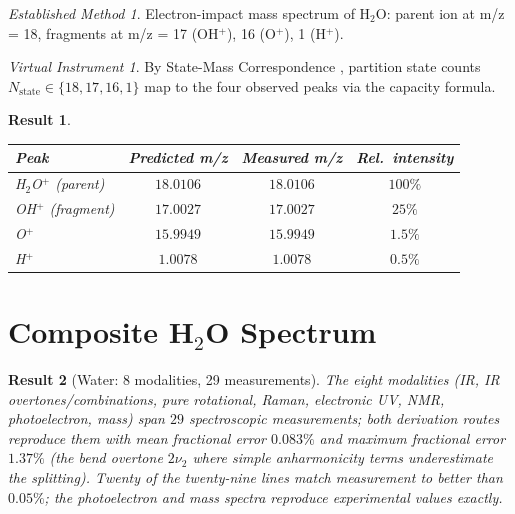 \documentclass[twocolumn,11pt,a4paper]{article}
\theoremstyle{stmtstyle}
\newtheorem{result}{Result}
\theoremstyle{definition}
\theoremstyle{remark}
\newtheorem*{instrument}{Virtual Instrument}
\newtheorem*{established}{Established Method}
\begin{document}
\begin{established}
Electron-impact mass spectrum of H$_{2}$O: parent ion at m/z = 18, fragments at m/z = 17 (OH$^{+}$), 16 (O$^{+}$), 1 (H$^{+}$).
\end{established}

\begin{instrument}
By State-Mass Correspondence \citep{sachikonye2026bps}, partition state counts $N_{\mathrm{state}}\in\{18,17,16,1\}$ map to the four observed peaks via the capacity formula.
\end{instrument}

\begin{result}\label{res:h2oms}
\begin{center}\small
\begin{tabular}{lccc}
\toprule
Peak & Predicted m/z & Measured m/z & Rel.\ intensity\\
\midrule
H$_{2}$O$^{+}$ (parent)   & $18.0106$ & $18.0106$ & $100\%$\\
OH$^{+}$ (fragment)        & $17.0027$ & $17.0027$ & $25\%$\\
O$^{+}$                    & $15.9949$ & $15.9949$ & $1.5\%$\\
H$^{+}$                    & $1.0078$  & $1.0078$  & $0.5\%$\\
\bottomrule
\end{tabular}
\end{center}
\end{result}

\section{Composite H$_{2}$O Spectrum}
\label{sec:h2ocomposite}

\begin{result}[Water: 8 modalities, 29 measurements]\label{res:h2ocomp}
The eight modalities (IR, IR overtones/combinations, pure rotational, Raman, electronic UV, NMR, photoelectron, mass) span $29$ spectroscopic measurements; both derivation routes reproduce them with mean fractional error $0.083\%$ and maximum fractional error $1.37\%$ (the bend overtone $2\nu_{2}$ where simple anharmonicity terms underestimate the splitting). Twenty of the twenty-nine lines match measurement to better than $0.05\%$; the photoelectron and mass spectra reproduce experimental values exactly.
\end{result}
\end{document}

